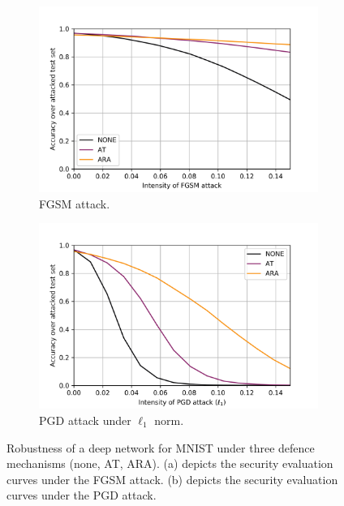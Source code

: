 \begin{figure}[!htb]
    \centering
    \begin{subfigure}[b]{0.45\textwidth}
        \includegraphics[width=\textwidth]{figures/comparison_mnist_fgsm.png}
        \caption{FGSM attack.}
        \label{fig:sub1}
    \end{subfigure}
    \begin{subfigure}[b]{0.45\textwidth}
        \includegraphics[width=\textwidth]{figures/comparison_mnist_pgdl1.png}
        \caption{PGD attack under $\ell_1$ norm.}
        \label{fig:sub2}
    \end{subfigure}
    \caption{Robustness of a deep network for MNIST under three defence mechanisms 
(none, AT, ARA). (a) depicts the security evaluation curves under the FGSM attack. (b) depicts the security evaluation curves under the PGD attack.}\label{fig:comparison_mnist}
\end{figure}

